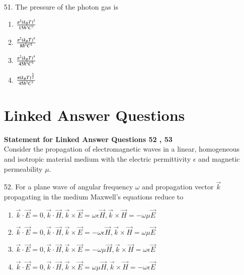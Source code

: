 \documentclass[journal,12pt,onecolumn]{IEEEtran}
\theoremstyle{remark}
\begin{document}
\begin{enumerate}
        \item[51.] The pressure of the photon gas is
            \hfill{}
            \begin{enumerate}
                \item $\frac{\pi^2 \left(k_B T\right)^3}{15\hbar ^3 C^3}$
                \item $\frac{\pi^2 \left(k_B T\right)^4}{8\hbar ^3 C^3}$
                \item $\frac{\pi^2 \left(k_B T\right)^4}{45\hbar ^3 C^3}$
                \item $\frac{\pi \left(k_B T\right)^\frac{3}{2}}{45\hbar ^3 C^3}$
            \end{enumerate}

            \section{\textbf{Linked Answer Questions}}
            \textbf{Statement for Linked Answer Questions 52 , 53}\\
            Consider the propagation of electromagnetic waves in a linear, homogeneous and isotropic
            material medium with the electric permittivity $\epsilon$ and magnetic permeability $\mu$.\\
        \item[52.] For a plane wave of angular frequency $\omega$ and propagation vector $\vec{k}$ propagating
            in the medium Maxwell's equations reduce to
            \hfill{}
            \begin{enumerate}
                \item $\vec{k}\cdot \vec{E} = 0, \vec{k}\cdot \vec{H}, \vec{k} \times \vec{E}=\omega\epsilon \vec{H}, \vec{k} \times \vec{H}=-\omega\mu\vec{E}$ 
                \item $\vec{k}\cdot \vec{E} = 0, \vec{k}\cdot \vec{H}, \vec{k} \times \vec{E}=-\omega\epsilon \vec{H}, \vec{k} \times \vec{H}=\omega\mu\vec{E}$ 
                \item $\vec{k}\cdot \vec{E} = 0, \vec{k}\cdot \vec{H}, \vec{k} \times \vec{E}=-\omega\mu \vec{H}, \vec{k} \times \vec{H}=\omega\epsilon\vec{E}$ 
                \item $\vec{k}\cdot \vec{E} = 0, \vec{k}\cdot \vec{H}, \vec{k} \times \vec{E}=\omega\mu \vec{H}, \vec{k} \times \vec{H}=-\omega\epsilon\vec{E}$ 
            \end{enumerate}

    \end{enumerate}
\end{document}
